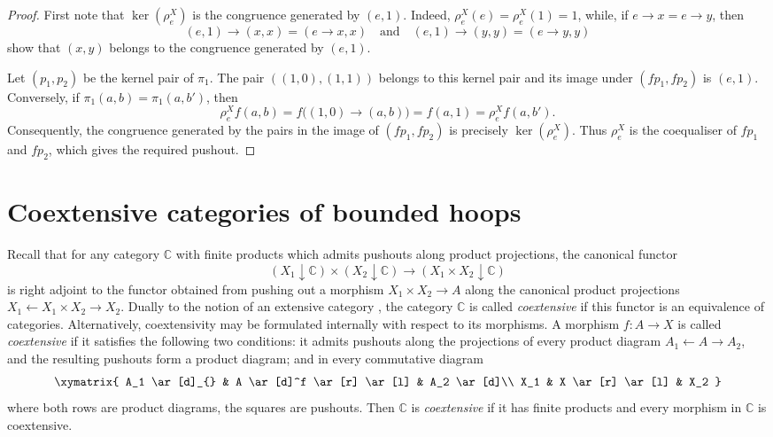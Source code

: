 \documentclass[11pt]{article}
\theoremstyle{pretty}
\theoremstyle{plainnote}
\newcommand{\C}{\mathbb{C}}
\renewcommand{\2}{\mathbf{2}}
\begin{document}
\begin{proof}
First note that $\ker(\rho_e^X)$ is the congruence generated by $(e,1)$. Indeed, $\rho_e^X(e)=\rho_e^X(1)=1$, while, if $e\to x=e\to y$, then
\[
(e,1)\to(x,x)=(e\to x,x)
\quad\text{and}\quad
(e,1)\to(y,y)=(e\to y,y)
\]
show that $(x,y)$ belongs to the congruence generated by $(e,1)$.

Let $(p_1,p_2)$ be the kernel pair of $\pi_1$. The pair $((1,0),(1,1))$ belongs to this kernel pair and its image under $(fp_1,fp_2)$ is $(e,1)$. Conversely, if $\pi_1(a,b)=\pi_1(a,b')$, then
\[
\rho_e^X f(a,b)=f\big((1,0)\to(a,b)\big)=f(a,1)=\rho_e^X f(a,b').
\]
Consequently, the congruence generated by the pairs in the image of $(fp_1,fp_2)$ is precisely $\ker(\rho_e^X)$. Thus $\rho_e^X$ is the coequaliser of $fp_1$ and $fp_2$, which gives the required pushout.
\end{proof}

\section{Coextensive categories of bounded hoops}
Recall that for any category $\C$ with finite products which admits pushouts along product projections, the canonical functor 
\[
(X_1\downarrow \C) \times (X_2 \downarrow \C) \to (X_1 \times X_2 \downarrow \C) \tag{$*$}
\]
is right adjoint to the functor obtained from pushing out a morphism $X_1 \times X_2 \to A$ along the canonical product projections $X_1 \leftarrow X_1 \times X_2 \to X_2$. Dually to the notion of an extensive category \cite[Proposition~2.2]{CarboniLackWalters1993}, the category $\C$ is called \emph{coextensive} if this functor is an equivalence of categories. Alternatively, coextensivity may be formulated internally with respect to its morphisms. A morphism $f:A \to X$ is called \emph{coextensive} \cite[Section~3]{HoefnagelTheart2025} if it satisfies the following two conditions: it admits pushouts along the projections of every product diagram $A_1\leftarrow A\to A_2$, and the resulting pushouts form a product diagram; and in every commutative diagram
\[\xymatrix{
      A_1  \ar[d]_{} &  A \ar[d]^f \ar[r] \ar[l] & A_2 \ar[d]\\
      X_1  & X \ar[r] \ar[l] & X_2
}\]
where both rows are product diagrams, the squares are pushouts. Then $\C$ is \emph{coextensive} if it has finite products and every morphism in $\C$ is coextensive.
\end{document}
